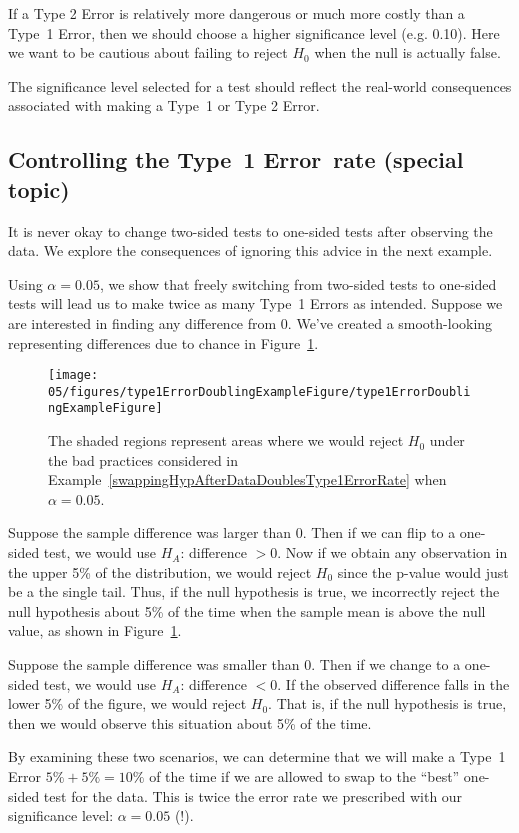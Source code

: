 If a Type 2 Error is relatively more dangerous or much more costly than a Type~1 Error, then we should choose a higher significance level (e.g. 0.10). Here we want to be cautious about failing to reject $H_0$ when the null is actually false.

\begin{tipBox}{
The significance level selected for a test should reflect the real-world consequences associated with making a Type~1 or Type 2 Error.}
\end{tipBox}

\subsection{Controlling the Type~1 Error~rate (special topic)}
\label{InflatingType1ErrorRate}

It is never okay to change two-sided tests to one-sided tests after observing the data. We explore the consequences of ignoring this advice in the next example.

\begin{example}{Using $\alpha=0.05$, we show that freely switching from two-sided tests to one-sided tests will lead us to make twice as many Type~1 Errors as intended.} \label{swappingHypAfterDataDoublesType1ErrorRate}
Suppose we are interested in finding any difference from 0. We've created a smooth-looking  representing differences due to chance in Figure~\ref{type1ErrorDoublingExampleFigure}.

\begin{figure}[h]
\centering
\texttt{[image: 05/figures/type1ErrorDoublingExampleFigure/type1ErrorDoublingExampleFigure]}
\caption{The shaded regions represent areas where we would reject $H_0$ under the bad practices considered in Example~\ref{swappingHypAfterDataDoublesType1ErrorRate} when $\alpha = 0.05$.}
\label{type1ErrorDoublingExampleFigure}
\end{figure}

Suppose the sample difference was larger than 0. Then if we can flip to a one-sided test, we would use $H_A$: difference $> 0$. Now if we obtain any observation in the upper 5\% of the distribution, we would reject $H_0$ since the p-value would just be a the single tail. Thus, if the null hypothesis is true, we incorrectly reject the null hypothesis about 5\% of the time when the sample mean is above the null value, as shown in Figure~\ref{type1ErrorDoublingExampleFigure}.

Suppose the sample difference was smaller than 0. Then if we change to a one-sided test, we would use $H_A$: difference $< 0$. If the observed difference falls in the lower 5\% of the figure, we would reject $H_0$. That is, if the null hypothesis is true, then we would observe this situation about 5\% of the time.

By examining these two scenarios, we can determine that we will make a Type~1 Error $5\%+5\%=10\%$ of the time if we are allowed to swap to the ``best'' one-sided test for the data. This is twice the error rate we prescribed with our significance level: $\alpha=0.05$ (!).
\end{example}

